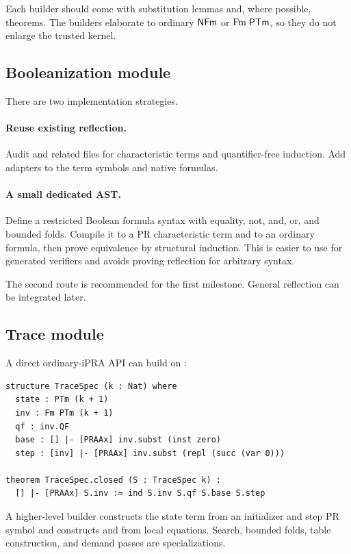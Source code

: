 Each builder should come with substitution lemmas and, where possible,
 theorems.  The builders elaborate to ordinary \(\mathsf{NFm}\) or
\(\mathrm{Fm}\;\mathsf{PTm}\), so they do not enlarge the trusted kernel.

\subsection{Booleanization module}

There are two implementation strategies.

\paragraph{Reuse existing reflection.}
Audit  and related files for characteristic terms and
quantifier-free induction.  Add adapters to the  term
symbols and native formulas.

\paragraph{A small dedicated AST.}
Define a restricted Boolean formula syntax with equality, not, and, or, and
bounded folds.  Compile it to a PR characteristic term and to an ordinary
formula, then prove equivalence by structural induction.  This is easier to use
for generated verifiers and avoids proving reflection for arbitrary syntax.

The second route is recommended for the first milestone.  General reflection
can be integrated later.

\subsection{Trace module}

A direct ordinary-iPRA API can build on :

\begin{lstlisting}[language={}]
structure TraceSpec (k : Nat) where
  state : PTm (k + 1)
  inv : Fm PTm (k + 1)
  qf : inv.QF
  base : [] |- [PRAAx] inv.subst (inst zero)
  step : [inv] |- [PRAAx] inv.subst (repl (succ (var 0)))

theorem TraceSpec.closed (S : TraceSpec k) :
  [] |- [PRAAx] S.inv := ind S.inv S.qf S.base S.step
\end{lstlisting}

A higher-level builder constructs the state term from an initializer and step
PR symbol and constructs  and  from local equations.
Search, bounded folds, table construction, and demand passes are specializations.

